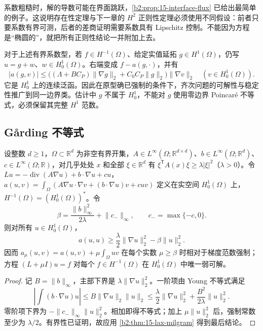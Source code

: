 \ProseParagraphBreak

系数粗糙时，解的导数可能在界面跳跃，\cref{b2:prop:15-interface-flux} 已给出最简单的例子。这说明存在性定理与下一章的 \(H^2\) 正则性定理必须使用不同假设：前者只要系数有界可测，后者的差商证明需要系数具有 Lipschitz 控制。不能因为方程是“椭圆的”，就把所有正则性结论一并附加上去。

\ProseParagraphBreak

对于上述有界系数型，若 \(f\in H^{-1}(\Omega)\)、给定实值延拓 \(g\in H^1(\Omega)\)，仍写 \(u=g+w\)、\(w\in H_0^1(\Omega)\)。右端变成 \(f-a(g,\cdot)\)，并有
\[
 |a(g,v)|\leq
 \bigl((\Lambda+BC_P)\|\nabla g\|_2+C_0C_P\|g\|_2\bigr)
       \|\nabla v\|_2\quad(v\in H_0^1(\Omega)).
\]
它是 \(H_0^1\) 上的连续泛函。因此在原型确已强制的条件下，齐次问题的可解性与稳定性推广到同一边界类。估计中 \(g\) 不属于 \(H_0^1\)，不能对 \(g\) 使用零边界 Poincaré 不等式，必须保留其完整 \(H^1\) 范数。

\subsection{Gårding 不等式}
\label{b2:subsec:150403}

\begin{proposition}
\label{b2:prop:15-garding}
设整数 \(d\geq1\)，\(\Omega\subset\mathbb R^d\) 为非空有界开集，\(A\in L^\infty(\Omega;\mathbb R^{d\times d})\)、\(b\in L^\infty(\Omega;\mathbb R^d)\)、\(c\in L^\infty(\Omega;\mathbb R)\)，对几乎处处 \(x\) 和全部 \(\xi\in\mathbb R^d\) 有 \(\xi^{\mathsf T}A(x)\xi\geq\lambda|\xi|^2\)（\(\lambda>0\)）。令 \(Lu=-\operatorname{div}(A\nabla u)+b\cdot\nabla u+cu\)，\(a(u,v)=\int_\Omega(A\nabla u\cdot\nabla v+(b\cdot\nabla u)v+cuv)\) 定义在实空间 \(H_0^1(\Omega)\) 上，\(H^{-1}(\Omega)=(H_0^1(\Omega))^*\)。令
\[\beta=\frac{\lVert b\rVert_\infty^2}{2\lambda}+\lVert c_-\rVert_\infty,
 \qquad c_- =\max\{-c,0\}.\]
则对所有 \(u\in H_0^1(\Omega)\)，
\[a(u,u)\ge\frac\lambda2\lVert\nabla u\rVert_2^2-\beta\lVert u\rVert_2^2.\]
因而 \(a_\mu(u,v)=a(u,v)+\mu\int_\Omega uv\) 在每个实数 \(\mu\ge\beta\) 时相对于梯度范数强制；方程 \((L+\mu I)u=f\) 对每个 \(f\in H^{-1}(\Omega)\) 在 \(H_0^1(\Omega)\) 中唯一弱可解。
\end{proposition}
\begin{proof}
记 \(B=\|b\|_\infty\)，主部下界是 \(\lambda\lVert\nabla u\rVert_2^2\)。一阶项由 Young 不等式满足
\[\left|\int(b\cdot\nabla u)u\right|
 \le B\lVert\nabla u\rVert_2\lVert u\rVert_2
 \le\frac\lambda2\lVert\nabla u\rVert_2^2+\frac{B^2}{2\lambda}\lVert u\rVert_2^2.\]
零阶项下界为 \(-\lVert c_-\rVert_\infty\lVert u\rVert_2^2\)。相加即得不等式；加上 \(\mu\lVert u\rVert_2^2\) 后，强制常数至少为 \(\lambda/2\)。有界性已证明，故应用 \cref{b2:thm:15-lax-milgram} 得到最后结论。
\end{proof}

